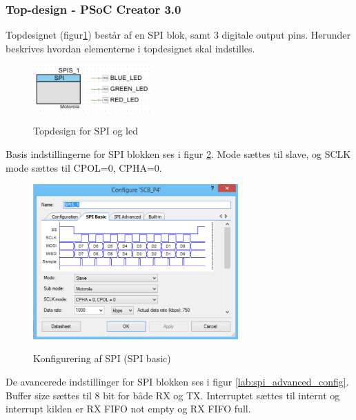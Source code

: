
\subsubsection*{Top-design - PSoC Creator 3.0}

Topdesignet (figur\ref{lab:topdesign_spi}) består af en SPI blok, samt 3 digitale output pins. Herunder beskrives hvordan elementerne i topdesignet skal indstilles.

\begin{figure}[H] \centering
{\includegraphics[width=0.4\textwidth]{filer/implementering/spi/spi_handler_topdesign}}
\caption{Topdesign for SPI og led}
\label{lab:topdesign_spi}
\raggedright
\end{figure}

Basis indstillingerne for SPI blokken ses i figur \ref{lab:spi_basic_config}. Mode sættes til slave, og SCLK mode sættes til CPOL=0, CPHA=0.

\begin{figure}[H] \centering
{\includegraphics[width=0.7\textwidth]{filer/implementering/spi/spi_handler_topdesign_spi_basic}}
\caption{Konfigurering af SPI (SPI basic)}
\label{lab:spi_basic_config}
\raggedright
\end{figure}

De avancerede indstillinger for SPI blokken ses i figur \ref{lab:spi_advanced_config}. Buffer size sættes til 8 bit for både RX og TX. Interruptet sættes til internt og interrupt kilden er RX FIFO not empty og RX FIFO full.

